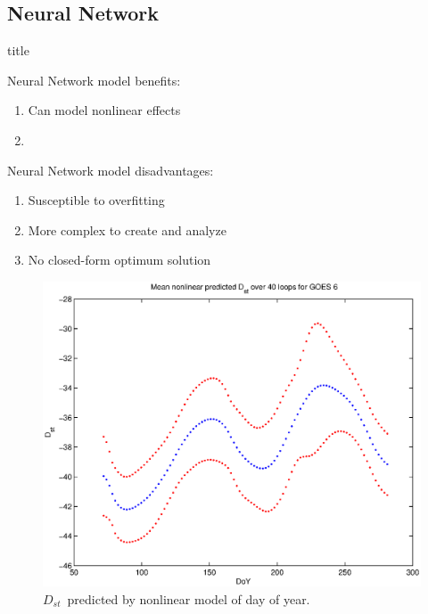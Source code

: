 \documentclass[xcolor={dvipsnames,table}]{beamer}
\newcommand{\subheader}{    		\begin{center}
  	\begin{beamercolorbox}[sep=4pt,center,shadow=true,rounded=true]{title}
  		\usebeamerfont{title}\subsecname\par%
  	\end{beamercolorbox}
  	\vfill
  	\end{center}}
\newcommand{\dst}{\ensuremath{D_{st}}} %
\begin{document}
\subsection{Neural Network}

\begin{frame}
	\subheader
	Neural Network model benefits:
	\begin{enumerate}
		\item Can model nonlinear effects
		\item 
	\end{enumerate}
	Neural Network model disadvantages:
	\begin{enumerate}
		\item Susceptible to overfitting
		\item More complex to create and analyze
		\item No closed-form optimum solution
	\end{enumerate}
\end{frame}


\begin{frame}
	\begin{figure}[htp!]
		\centering
		\includegraphics[width=0.7\linewidth]{Figures/NNDoY-Dst-GOES6}	
		\caption{\dst\ predicted by nonlinear model of day of year.}
		\label{fig:DoYDst}
	\end{figure}
\end{frame}
\end{document}
